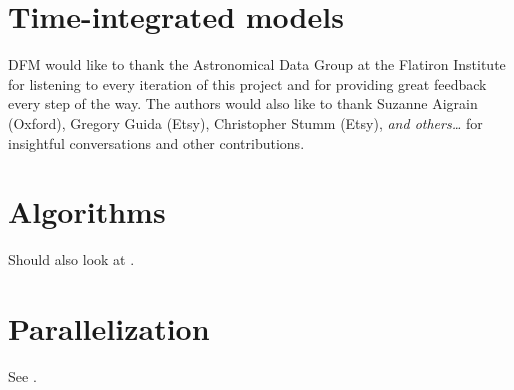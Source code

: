 \documentclass[modern]{aastex631}
\begin{document}
\section{Time-integrated models}



\begin{acknowledgments}
    DFM would like to thank the Astronomical Data Group at the Flatiron Institute for listening to every iteration of this project and for providing great feedback every step of the way.
    The authors would also like to thank
    Suzanne Aigrain (Oxford),
    Gregory Guida (Etsy),
    Christopher Stumm (Etsy),
    \emph{and others\ldots}
    for insightful conversations and other contributions.
\end{acknowledgments}


\appendix
\section{Algorithms}

Should also look at \citet{Pernet:2018}.

\section{Parallelization}

See \citet{Sarkka:2020}.



\end{document}
